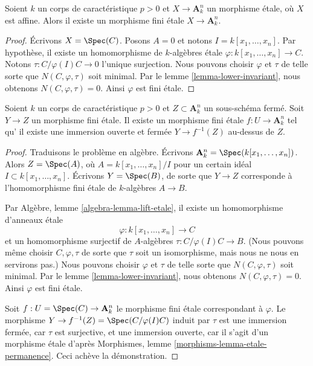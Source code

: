 \begin{lemma}
\label{lemma-affine-etale-over-affine-space}
Soient $k$ un corps de caractéristique $p > 0$ et $X \to \mathbf{A}^n_k$ un
morphisme \'etale, où $X$ est affine. Alors il existe un morphisme fini \'etale
$X \to \mathbf{A}^n_k$.
\end{lemma}

\begin{proof}
Écrivons $X = \Spec(C)$. Posons $A = 0$ et notons $I = k[x_1, \ldots, x_n]$.
Par hypothèse, il existe un homomorphisme de $k$-algèbres \'etale
$\varphi : k[x_1, \ldots, x_n] \to C$. Notons $\tau : C/\varphi(I)C \to 0$
l'unique surjection. Nous pouvons choisir $\varphi$ et $\tau$ de telle sorte
que $N(C, \varphi, \tau)$ soit minimal. Par le lemme \ref{lemma-lower-invariant},
nous obtenons $N(C, \varphi, \tau) = 0$. Ainsi $\varphi$ est fini \'etale.
\end{proof}

\begin{lemma}
\label{lemma-dominate-affine-space}
Soient $k$ un corps de caractéristique $p > 0$ et $Z \subset \mathbf{A}^n_k$
un sous-schéma fermé. Soit $Y \to Z$ un morphisme fini \'etale. Il existe un
morphisme fini \'etale $f : U \to \mathbf{A}^n_k$ tel qu'
il existe une immersion ouverte et fermée $Y \to f^{-1}(Z)$ au-dessus de $Z$.
\end{lemma}

\begin{proof}
Traduisons le problème en algèbre. Écrivons
$\mathbf{A}^n_k = \Spec(k[x_1, \ldots, x_n])$.
Alors $Z = \Spec(A)$, où $A = k[x_1, \ldots, x_n]/I$
pour un certain idéal $I \subset k[x_1, \ldots, x_n]$.
Écrivons $Y = \Spec(B)$, de sorte que $Y \to Z$ corresponde à
l'homomorphisme fini \'etale de $k$-algèbres $A \to B$.

\medskip\noindent
Par Algèbre, lemme \ref{algebra-lemma-lift-etale},
il existe un homomorphisme d'anneaux \'etale
$$
\varphi : k[x_1, \ldots, x_n] \to C
$$
et un homomorphisme surjectif de $A$-algèbres $\tau : C/\varphi(I)C \to B$.
(Nous pouvons même choisir $C, \varphi, \tau$ de sorte que $\tau$ soit un isomorphisme,
mais nous ne nous en servirons pas.) Nous pouvons choisir $\varphi$ et $\tau$ de telle sorte
que $N(C, \varphi, \tau)$ soit minimal. Par le lemme \ref{lemma-lower-invariant},
nous obtenons $N(C, \varphi, \tau) = 0$. Ainsi $\varphi$ est fini \'etale.

\medskip\noindent
Soit $f : U = \Spec(C) \to \mathbf{A}^n_k$ le morphisme fini \'etale
correspondant à $\varphi$. Le morphisme
$Y \to f^{-1}(Z) = \Spec(C/\varphi(I)C)$ induit par $\tau$
est une immersion fermée, car $\tau$ est surjective, et une immersion ouverte, car
il s'agit d'un morphisme \'etale d'après Morphismes, lemme
\ref{morphisms-lemma-etale-permanence}. Ceci achève la démonstration.
\end{proof}

